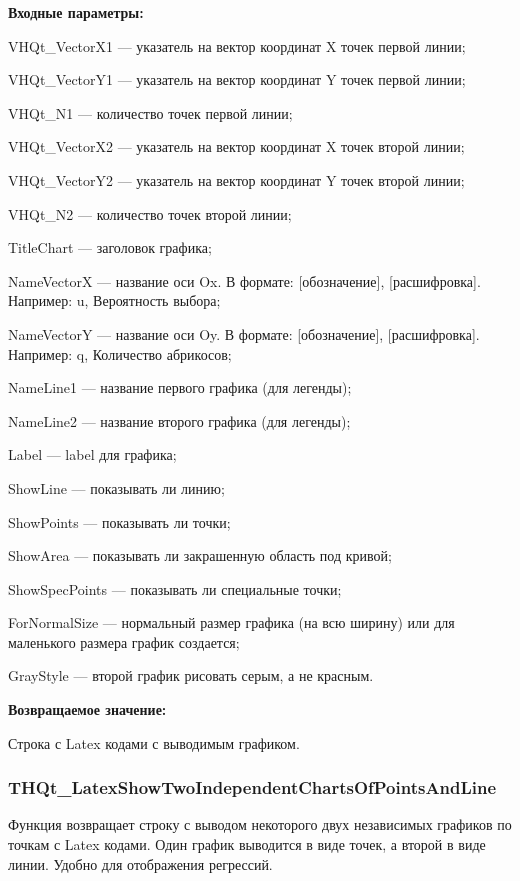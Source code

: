 \documentclass[a4paper,12pt]{article}
\begin{document}
\textbf{Входные параметры:}
 
VHQt\_VectorX1 --- указатель на вектор координат X точек первой линии;
 
VHQt\_VectorY1 --- указатель на вектор координат Y точек первой линии;
 
VHQt\_N1 --- количество точек первой линии;
 
VHQt\_VectorX2 --- указатель на вектор координат X точек второй линии;
 
VHQt\_VectorY2 --- указатель на вектор координат Y точек второй линии;
 
VHQt\_N2 --- количество точек второй линии;
 
TitleChart --- заголовок графика;
 
NameVectorX --- название оси Ox. В формате: [обозначение], [расшифровка]. Например: u, Вероятность выбора;
 
NameVectorY --- название оси Oy. В формате: [обозначение], [расшифровка]. Например: q, Количество абрикосов;
 
NameLine1 --- название первого графика (для легенды);
 
NameLine2 --- название второго графика (для легенды);
 
Label --- label для графика;
 
ShowLine --- показывать ли линию;
 
ShowPoints --- показывать ли точки;
 
ShowArea --- показывать ли закрашенную область под кривой;
 
ShowSpecPoints --- показывать ли специальные точки;
 
ForNormalSize --- нормальный размер графика (на всю ширину) или для маленького размера график создается;
 
GrayStyle --- второй график рисовать серым, а не красным.
	
\textbf{Возвращаемое значение:}

Строка с Latex кодами с выводимым графиком.


\subsubsection{THQt\_LatexShowTwoIndependentChartsOfPointsAndLine}\label{THQt_LatexShowTwoIndependentChartsOfPointsAndLine}

Функция возвращает строку с выводом некоторого двух независимых графиков по точкам с Latex кодами. Один график выводится в виде точек, а второй в виде линии. Удобно для отображения регрессий.
\end{document}
